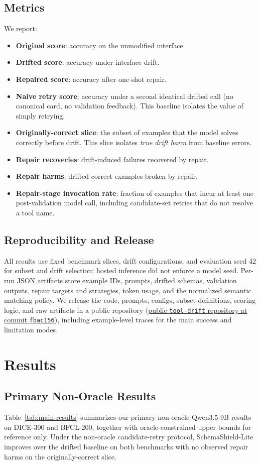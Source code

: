 \documentclass{llncs}
\newcommand{\method}{SchemaShield-Lite\xspace}
\newcommand{\artifactrepo}{https://github.com/AniruddhaChattopadhyay/tool-drift}
\newcommand{\artifactcommit}{fbac15632f1ef8133fe83ce8eccb2ee071f0891e}
\newcommand{\artifactrepolink}{\href{\artifactrepo/tree/\artifactcommit}{public
\texttt{tool-drift} repository at commit \texttt{fbac156}}}
\begin{document}
\subsection{Metrics}
We report:
\begin{itemize}
\item \textbf{Original score}: accuracy on the unmodified interface.
\item \textbf{Drifted score}: accuracy under interface drift.
\item \textbf{Repaired score}: accuracy after one-shot repair.
\item \textbf{Naive retry score}: accuracy under a second identical drifted call
(no canonical card, no validation feedback). This baseline isolates the value of
simply retrying.
\item \textbf{Originally-correct slice}: the subset of examples that the model solves
correctly before drift. This slice isolates \emph{true drift harm} from baseline
errors.
\item \textbf{Repair recoveries}: drift-induced failures recovered by repair.
\item \textbf{Repair harms}: drifted-correct examples broken by repair.
\item \textbf{Repair-stage invocation rate}: fraction of examples that incur at
least one post-validation model call, including candidate-set retries that do not
resolve a tool name.
\end{itemize}

\subsection{Reproducibility and Release}
All results use fixed benchmark slices, drift configurations, and evaluation seed
42 for subset and drift selection; hosted inference did not enforce a model seed.
Per-run JSON artifacts store example IDs, prompts, drifted schemas, validation
outputs, repair targets and strategies, token usage, and the normalized semantic
matching policy. We release the code, prompts, configs, subset definitions,
scoring logic, and raw artifacts in a public repository (\artifactrepolink),
including example-level traces for the main success and limitation modes.

\section{Results}
\subsection{Primary Non-Oracle Results}
Table~\ref{tab:main-results} summarizes our primary non-oracle Qwen3.5-9B results
on DICE-300 and BFCL-200, together with oracle-constrained upper bounds for
reference only. Under the non-oracle candidate-retry protocol, \method improves
over the drifted baseline on both benchmarks with no observed repair harms on the
originally-correct slice.
\end{document}
